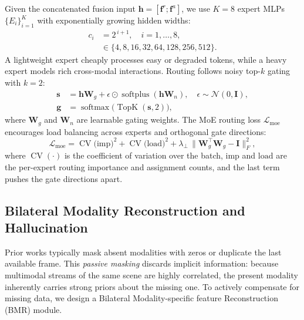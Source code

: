 Given the concatenated fusion input $\mathbf{h}=[\mathbf{f}^{r};\mathbf{f}^{a}]$, we use $K\!=\!8$ expert MLPs $\{E_i\}_{i=1}^{K}$ with exponentially growing hidden widths:
\begin{equation}
\begin{aligned}
  c_i &= 2^{\,i+1},\quad i=1,\dots,8, \\
      &\in \{4,8,16,32,64,128,256,512\}.
\end{aligned}
\label{eq:capacity}
\end{equation}
A lightweight expert cheaply processes easy or degraded tokens, while a heavy expert models rich cross-modal interactions. Routing follows noisy top-$k$ gating~\cite{shazeer2017moe} with $k\!=\!2$:
\begin{align}
  \mathbf{s} &= \mathbf{h}\mathbf{W}_g + \epsilon\odot\operatorname{softplus}(\mathbf{h}\mathbf{W}_n), \quad \epsilon\sim\mathcal{N}(0,\mathbf{I}),\\
  \mathbf{g} &= \operatorname{softmax}\!\big(\operatorname{TopK}(\mathbf{s}, 2)\big),
\end{align}
where $\mathbf{W}_g$ and $\mathbf{W}_n$ are learnable gating weights. The MoE routing loss $\mathcal{L}_{\text{moe}}$ encourages load balancing across experts and orthogonal gate directions:
\begin{equation}
  \mathcal{L}_{\text{moe}} = \operatorname{CV}\!\big(\text{imp}\big)^2 + \operatorname{CV}\!\big(\text{load}\big)^2 + \lambda_{\perp}\,\big\|\mathbf{W}_g^{\!\top}\mathbf{W}_g - \mathbf{I}\big\|_F^2,
  \label{eq:moe-loss}
\end{equation}
where $\operatorname{CV}(\cdot)$ is the coefficient of variation over the batch, $\text{imp}$ and $\text{load}$ are the per-expert routing importance and assignment counts, and the last term pushes the gate directions apart.

\subsection{Bilateral Modality Reconstruction and Hallucination}
\label{subsec:bmr}
Prior works typically mask absent modalities with zeros or duplicate the last available frame. This \emph{passive masking} discards implicit information: because multimodal streams of the same scene are highly correlated, the present modality inherently carries strong priors about the missing one. To actively compensate for missing data, we design a Bilateral Modality-specific feature Reconstruction (BMR) module. 

